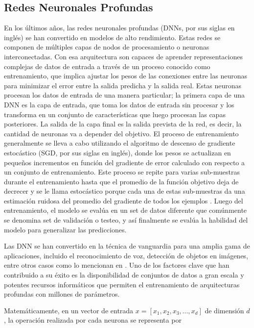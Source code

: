 \documentclass[10pt, oneside, a4paper]{article}
\begin{document}
	\subsection{Redes Neuronales Profundas} \label{dnn}
	
	En los últimos años, las redes neuronales profundas (DNNs, por sus siglas en inglés) se han convertido en modelos de alto rendimiento. Estas redes se componen de múltiples capas de nodos de procesamiento o neuronas interconectadas. Con esa arquitectura son capaces de aprender representaciones complejas de datos de entrada a través de un proceso conocido como entrenamiento, que implica ajustar los pesos de las conexiones entre las neuronas para minimizar el error entre la salida predicha y la salida real. Estas neuronas procesan los datos de entrada de una manera particular; la primera capa de una DNN es la capa de entrada, que toma los datos de entrada sin procesar y los transforma en un conjunto de características que luego procesan las capas posteriores. La salida de la capa final es la salida prevista de la red, es decir, la cantidad de neuronas va a depender del objetivo. El proceso de entrenamiento generalmente se lleva a cabo utilizando el algoritmo de descenso de gradiente estocástico (SGD, por sus siglas en inglés), donde los pesos se actualizan en pequeños incrementos en función del gradiente de error calculado con respecto a un conjunto de entrenamiento. Este proceso se repite para varias sub-muestras durante el entrenamiento hasta que el promedio de la función objetivo deja de decrecer y se le llama estocástico porque cada una de estas sub-muestras da una estimación ruidosa del promedio del gradiente de todos los ejemplos \cite{LeCun2015}. Luego del entrenamiento, el modelo se evalúa en un set de datos diferente que comúnmente se denomina set de validación o testeo, y así finalmente se evalúa la habilidad del modelo para generalizar las predicciones. 
	
	Las DNN se han convertido en la técnica de vanguardia para una amplia gama de aplicaciones, incluido el reconocimiento de voz, detección de objetos en imágenes, entre otros casos como lo mencionan en \cite{LeCun2015}. Uno de los factores clave que han contribuido a su éxito es la disponibilidad de conjuntos de datos a gran escala y potentes recursos informáticos que permiten el entrenamiento de arquitecturas profundas con millones de parámetros.
	
	Matemáticamente, en un vector de entrada $x = [x_{1}, x_{2}, x_{3}, ... , x_{d}]$ de dimensión $d$, la operación realizada por cada neurona se representa por
	
\end{document}
